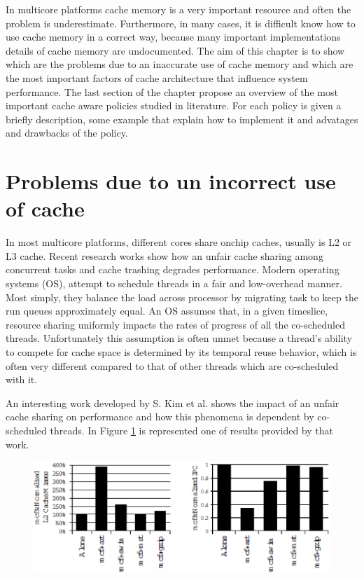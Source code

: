 In multicore platforms cache memory is a very important resource and often the problem is underestimate. Furthermore, in many cases, it is difficult know 
how to use cache memory in a correct way, because many important implementations details of cache memory are undocumented. The aim of this chapter is 
to show which are the problems due to an inaccurate use of cache memory and which are the most important factors of cache architecture that influence 
system performance. The last section of the chapter propose an overview of the most important cache aware policies studied in literature. For each policy 
is given a briefly description, some example that explain how to implement it and advatages and drawbacks of the policy.

\section{Problems due to un incorrect use of cache}
\label{sec:s1}

In most multicore platforms, different cores share onchip caches, usually is L2 or L3 cache. Recent research works show how an unfair cache sharing
among concurrent tasks and cache trashing degrades performance. Modern operating systems (OS), attempt to schedule threads in a
fair and low-overhead manner.
Most simply, they balance the load across processor by migrating task to keep the run queues approximately equal. An OS assumes that,
in a given timeslice, resource sharing uniformly impacts the rates of progress of all the co-scheduled threads.
Unfortunately this assumption is often unmet because a thread's ability to compete for cache space is determined by its temporal reuse behavior,
which is often very different compared to that of other threads which are co-scheduled with it.

An interesting work developed by S. Kim et al. shows the impact of an unfair cache sharing on performance and how this phenomena is dependent by
co-scheduled threads. In Figure \ref{fig:gzip_miss} is represented one of results provided by that work.

\begin{figure}[htbp]
\centering
\includegraphics[width=\widefigure]{images/chandra_gzip}
\caption{}
\label{fig:gzip_miss}
\end{figure}

